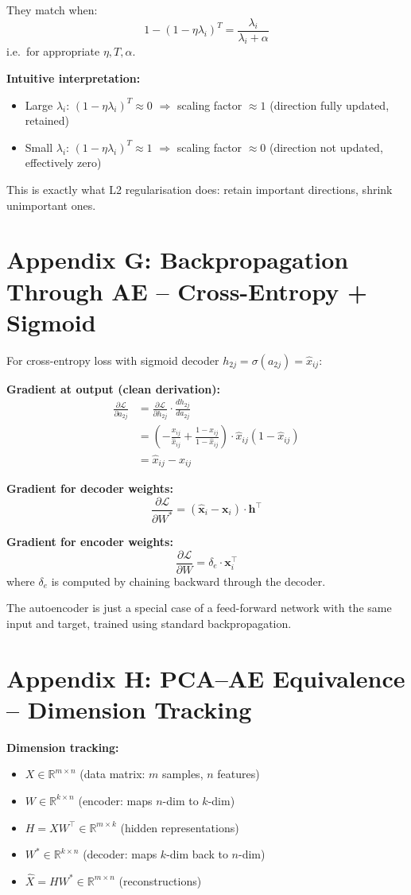 \documentclass[12pt,a4paper]{article}
\newcommand{\R}{\mathbb{R}}
\newcommand{\vx}{\mathbf{x}}
\newcommand{\vh}{\mathbf{h}}
\newcommand{\hatx}{\hat{\mathbf{x}}}
\newcommand{\Loss}{\mathcal{L}}
\begin{document}
They match when:
\[
1 - (1-\eta\lambda_i)^T = \frac{\lambda_i}{\lambda_i+\alpha}
\]
i.e.\ for appropriate $\eta, T, \alpha$.

\textbf{Intuitive interpretation:}
\begin{itemize}
  \item Large $\lambda_i$: $(1-\eta\lambda_i)^T \approx 0$ $\Rightarrow$ scaling factor $\approx 1$ (direction fully updated, retained)
  \item Small $\lambda_i$: $(1-\eta\lambda_i)^T \approx 1$ $\Rightarrow$ scaling factor $\approx 0$ (direction not updated, effectively zero)
\end{itemize}

This is exactly what L2 regularisation does: retain important directions, shrink unimportant ones.

\section{Appendix G: Backpropagation Through AE -- Cross-Entropy + Sigmoid}

For cross-entropy loss with sigmoid decoder $h_{2j} = \sigma(a_{2j}) = \hat{x}_{ij}$:

\textbf{Gradient at output (clean derivation):}
\begin{align*}
\frac{\partial\Loss}{\partial a_{2j}}
&= \frac{\partial\Loss}{\partial h_{2j}}\cdot\frac{dh_{2j}}{da_{2j}}\\
&= \left(-\frac{x_{ij}}{\hat{x}_{ij}} + \frac{1-x_{ij}}{1-\hat{x}_{ij}}\right)\cdot\hat{x}_{ij}(1-\hat{x}_{ij})\\
&= \hat{x}_{ij} - x_{ij}
\end{align*}

\textbf{Gradient for decoder weights:}
\[
\frac{\partial\Loss}{\partial W^*}
= (\hatx_i - \vx_i)\cdot\vh^\top
\]

\textbf{Gradient for encoder weights:}
\[
\frac{\partial\Loss}{\partial W}
= \delta_e \cdot \vx_i^\top
\]
where $\delta_e$ is computed by chaining backward through the decoder.

The autoencoder is just a special case of a feed-forward network with the same input and target, trained using standard backpropagation.

\section{Appendix H: PCA--AE Equivalence -- Dimension Tracking}

\textbf{Dimension tracking:}
\begin{itemize}
  \item $X \in \R^{m\times n}$ (data matrix: $m$ samples, $n$ features)
  \item $W \in \R^{k\times n}$ (encoder: maps $n$-dim to $k$-dim)
  \item $H = XW^\top \in \R^{m\times k}$ (hidden representations)
  \item $W^* \in \R^{k\times n}$ (decoder: maps $k$-dim back to $n$-dim)
  \item $\hat{X} = HW^* \in \R^{m\times n}$ (reconstructions)
\end{itemize}
\end{document}
